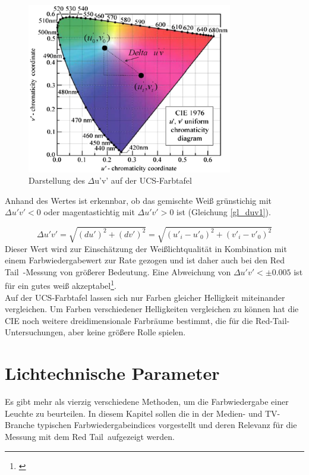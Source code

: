 \begin{figure}[H]     %
\centering
\includegraphics[width=0.8\textwidth]{bilder/duv1} 
\caption {Darstellung des $\Delta$u'v' auf der UCS-Farbtafel}\label{b_duv}
\end{figure}


\noindent Anhand des Wertes ist erkennbar, ob das gemischte Weiß grünstichig mit $\Delta u'v' < 0$ oder magentastichtig mit $\Delta u'v' > 0$ ist (Gleichung \ref{gl_duv1}).

\begin{equation}\label{gl_duv1}
		\Delta u'v'=\sqrt{(du')^{2}+(dv')^{2}}=\sqrt{(u'_{i}-u'_{0})^{2}+(v'_{i}-v'_{0})^{2}}
\end{equation}
Dieser Wert wird zur Einschätzung der Weißlichtqualität in Kombination mit einem Farbwiedergabewert zur Rate gezogen und ist daher auch bei den \glqq Red Tail\grqq\ -Messung von größerer Bedeutung. Eine Abweichung von $\Delta u'v' < \pm 0.005$ ist für ein gutes weiß akzeptabel\footnote{\cite{ohno}}.\\
Auf der UCS-Farbtafel lassen sich nur Farben gleicher Helligkeit miteinander vergleichen. Um Farben verschiedener Helligkeiten vergleichen zu können hat die CIE noch weitere dreidimensionale Farbräume bestimmt, die für die Red-Tail-Untersuchungen, aber keine größere Rolle spielen.\newpage


\chapter{Lichtechnische Parameter}
Es gibt mehr als vierzig verschiedene Methoden, um die Farbwiedergabe einer Leuchte zu beurteilen. In diesem Kapitel sollen die in der Medien- und TV-Branche typischen Farbwiedergabeindices vorgestellt und deren Relevanz für die Messung mit dem \glqq Red Tail\grqq\  aufgezeigt werden.

